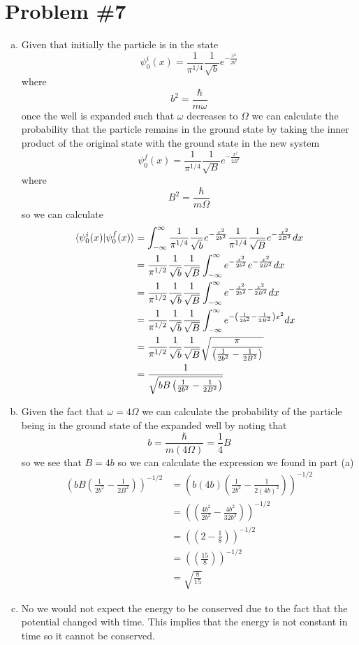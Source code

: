 \documentclass[11pt]{article}
\numberwithin{equation}{section}
\begin{document}
\section{Problem \#7}
\begin{enumerate}[(a)]
\item
Given that initially the particle is in the state
$$\psi^i_0(x) = \frac{1}{\pi^{1/4}}\frac{1}{\sqrt{b}}e^{-\frac{x^2}{2b^2}}$$
where 
$$b^2 = \frac{\hbar}{m\omega}$$
once the well is expanded such that $\omega$ decreases to $\Omega$ we can calculate the probability that the particle remains in the ground state by taking the inner product of the original state with the ground state in the new system 
$$\psi^f_0(x) = \frac{1}{\pi^{1/4}}\frac{1}{\sqrt{B}}e^{-\frac{x^2}{2B^2}}$$
where
$$B^2 = \frac{\hbar}{m\Omega}$$
so we can calculate
\begin{align*}
\langle{\psi^i_0(x)}|{\psi^f_0(x)}\rangle &= \int_{-\infty}^{\infty}\frac{1}{\pi^{1/4}}\frac{1}{\sqrt{b}}e^{-\frac{x^2}{2b^2}}\frac{1}{\pi^{1/4}}\frac{1}{\sqrt{B}}e^{-\frac{x^2}{2B^2}}dx\\
&= \frac{1}{\pi^{1/2}}\frac{1}{\sqrt{b}}\frac{1}{\sqrt{B}}\int_{-\infty}^{\infty}e^{-\frac{x^2}{2b^2}}e^{-\frac{x^2}{2B^2}}dx\\
&= \frac{1}{\pi^{1/2}}\frac{1}{\sqrt{b}}\frac{1}{\sqrt{B}}\int_{-\infty}^{\infty}e^{-\frac{x^2}{2b^2}-\frac{x^2}{2B^2}}dx\\
&= \frac{1}{\pi^{1/2}}\frac{1}{\sqrt{b}}\frac{1}{\sqrt{B}}\int_{-\infty}^{\infty}e^{-\left(\frac{1}{2b^2}-\frac{1}{2B^2}\right)x^2}dx\\
&= \frac{1}{\pi^{1/2}}\frac{1}{\sqrt{b}}\frac{1}{\sqrt{B}}\sqrt{\frac{\pi}{\left(\frac{1}{2b^2}-\frac{1}{2B^2}\right)}}\\
&= \frac{1}{\sqrt{bB\left(\frac{1}{2b^2}-\frac{1}{2B^2}\right)}}
\end{align*}

\item
Given the fact that $\omega = 4\Omega$ we can calculate the probability of the particle being in the ground state of the expanded well by noting that
$$b = \frac{\hbar}{m(4\Omega)} = \frac{1}{4}B$$
so we see that $B = 4b$ so we can calculate the expression we found in part (a)
\begin{align*}
\left(bB\left(\frac{1}{2b^2}-\frac{1}{2B^2}\right)\right)^{-1/2} &= \left(b(4b)\left(\frac{1}{2b^2}-\frac{1}{2(4b)^2}\right)\right)^{-1/2}\\
&= \left(\left(\frac{4b^2}{2b^2}-\frac{4b^2}{32b^2}\right)\right)^{-1/2}\\
&= \left(\left(2-\frac{1}{8}\right)\right)^{-1/2}\\
&= \left(\left(\frac{15}{8}\right)\right)^{-1/2}\\
&= \sqrt{\frac{8}{15}}
\end{align*}

\item
No we would not expect the energy to be conserved due to the fact that the potential changed with time. This implies that the energy is not constant in time so it cannot be conserved.
\end{enumerate}
\end{document}
